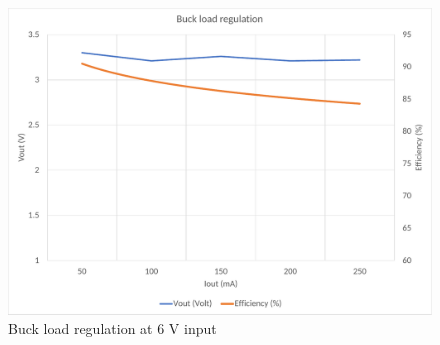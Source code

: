 \\
\begin{figure}[H]
	\centering
	\includegraphics[width=\columnwidth]{IMGS/Buck load regulation at 6V input.pdf}
	\caption{Buck load regulation at 6 V input}
	\label{fig:arch}
\end{figure}



